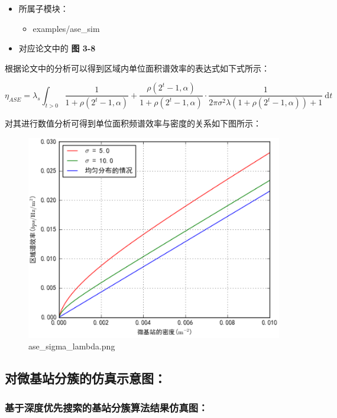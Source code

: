 \documentclass[11pt]{article}
\makeatletter
\def\maxwidth{\ifdim\Gin@nat@width>\linewidth\linewidth
    \else\Gin@nat@width\fi}
\let\Oldincludegraphics\includegraphics
\renewcommand{\includegraphics}[1]{\Oldincludegraphics[width=.8\maxwidth]{#1}}
\providecommand{\tightlist}{%
      \setlength{\itemsep}{0pt}\setlength{\parskip}{0pt}}
\makeatother
\begin{document}
\begin{itemize}
\tightlist
\item
  所属子模块：

  \begin{itemize}
  \tightlist
  \item
    examples/ase\_sim
  \end{itemize}
\item
  对应论文中的 \textbf{图 3-8}
\end{itemize}

根据论文中的分析可以得到区域内单位面积谱效率的表达式如下式所示：

\[\tag{3}
\eta_{ASE} =
\lambda_s\int_{t>0}\frac{1}{1+\rho(2^t-1,\alpha)} + \frac{\rho(2^t-1, \alpha)}{1+\rho(2^t-1,\alpha)} \cdot \frac{1}{2\pi\sigma^2\lambda(1+\rho(2^t-1,\alpha))+1}\ \mathrm{d}t
\]

对其进行数值分析可得到单位面积频谱效率与密度的关系如下图所示：

\begin{figure}[htbp]
\centering
\includegraphics{ase_sigma_lambda.png}
\caption{ase\_sigma\_lambda.png}
\end{figure}

    \subsection{对微基站分簇的仿真示意图：}\label{ux5bf9ux5faeux57faux7ad9ux5206ux7c07ux7684ux4effux771fux793aux610fux56fe}

\subsubsection{基于深度优先搜索的基站分簇算法结果仿真图：}\label{ux57faux4e8eux6df1ux5ea6ux4f18ux5148ux641cux7d22ux7684ux57faux7ad9ux5206ux7c07ux7b97ux6cd5ux7ed3ux679cux4effux771fux56fe}
\end{document}
